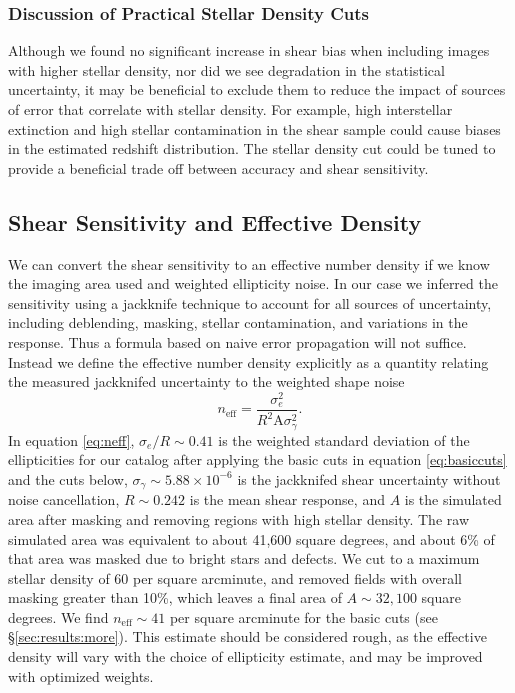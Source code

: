 \documentclass[twocolumn,twocolappendix,astrosym]{openjournal}
\begin{document}
\subsubsection{Discussion of Practical Stellar Density Cuts}

Although we found no significant increase in shear bias when including images
with higher stellar density, nor did we see degradation in the statistical
uncertainty, it may be beneficial to exclude them to reduce the impact of
sources of error that correlate with stellar density.  For example, high
interstellar extinction and high stellar contamination in the shear sample
could cause biases in the estimated redshift distribution.  The stellar density
cut could be tuned to provide a beneficial trade off between accuracy and shear
sensitivity.

\subsection{Shear Sensitivity and Effective Density} \label{sec:results:effdens}


We can convert the shear sensitivity to an effective number density if we know
the imaging area used and weighted ellipticity noise.  In our case we inferred the
sensitivity using a jackknife technique to account for all sources of
uncertainty, including deblending, masking, stellar contamination, and
variations in the response.  Thus a formula based on naive error propagation
will not suffice.  Instead we define the effective number density explicitly as
a quantity relating the measured jackknifed uncertainty to the weighted shape
noise
\begin{equation} \label{eq:neff}
    n_{\mathrm{eff}} = \frac{\sigma^2_{e}}{R^2 \mathrm{A} \sigma^2_{\gamma}}.
\end{equation}
In equation \ref{eq:neff}, $\sigma_e/R \sim 0.41$ is the weighted standard
deviation of the ellipticities for our catalog after applying the basic cuts in
equation \ref{eq:basiccuts} and the cuts below, $\sigma_\gamma \sim 5.88 \times
10^{-6}$ is the jackknifed shear uncertainty without noise cancellation, $R
\sim 0.242$ is the mean shear response, and $A$ is the simulated area after
masking and removing regions with high stellar density.    The raw simulated
area was equivalent to about 41,600 square degrees, and about 6\% of that area
was masked due to bright stars and defects.  We cut to a maximum stellar
density of 60 per square arcminute, and removed fields with overall masking
greater than 10\%, which leaves a final area of $A \sim 32,100$ square degrees.
We find $n_\mathrm{eff} \sim 41$ per square arcminute for the basic cuts (see
\S \ref{sec:results:more}).  This estimate should be considered rough, as the
effective density will vary with the choice of ellipticity estimate, and may be
improved with optimized weights.
\end{document}
